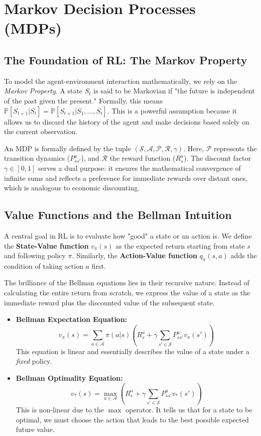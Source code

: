 \section{Markov Decision Processes (MDPs)}

\subsection{The Foundation of RL: The Markov Property}
To model the agent-environment interaction mathematically, we rely on the \textit{Markov Property}. A state $S_t$ is said to be Markovian if "the future is independent of the past given the present." Formally, this means $\mathbb{P}[S_{t+1} | S_t] = \mathbb{P}[S_{t+1} | S_1, \dots, S_t]$. This is a powerful assumption because it allows us to discard the history of the agent and make decisions based solely on the current observation.

An MDP is formally defined by the tuple $(\mathcal{S}, \mathcal{A}, \mathcal{P}, \mathcal{R}, \gamma)$. Here, $\mathcal{P}$ represents the transition dynamics ($P_{ss'}^a$), and $\mathcal{R}$ the reward function ($R_s^a$). The discount factor $\gamma \in [0, 1]$ serves a dual purpose: it ensures the mathematical convergence of infinite sums and reflects a preference for immediate rewards over distant ones, which is analogous to economic discounting.

\subsection{Value Functions and the Bellman Intuition}
A central goal in RL is to evaluate how "good" a state or an action is. We define the \textbf{State-Value function} $v_\pi(s)$ as the expected return starting from state $s$ and following policy $\pi$. Similarly, the \textbf{Action-Value function} $q_\pi(s, a)$ adds the condition of taking action $a$ first.

The brilliance of the Bellman equations lies in their recursive nature. Instead of calculating the entire return from scratch, we express the value of a state as the immediate reward plus the discounted value of the subsequent state.
\begin{itemize}
    \item \textbf{Bellman Expectation Equation:} 
    \[ v_\pi(s) = \sum_{a \in \mathcal{A}} \pi(a|s) \left( R_s^a + \gamma \sum_{s' \in \mathcal{S}} P_{ss'}^a v_\pi(s') \right) \]
    This equation is linear and essentially describes the value of a state under a \textit{fixed} policy.
    \item \textbf{Bellman Optimality Equation:} 
    \[ v_*(s) = \max_{a \in \mathcal{A}} \left( R_s^a + \gamma \sum_{s' \in \mathcal{S}} P_{ss'}^a v_*(s') \right) \]
    This is non-linear due to the $\max$ operator. It tells us that for a state to be optimal, we must choose the action that leads to the best possible expected future value.
\end{itemize}

